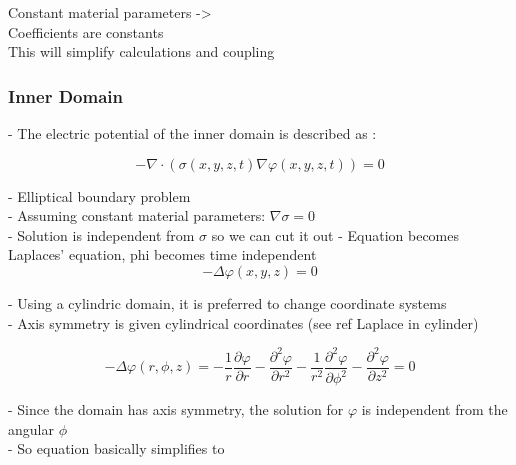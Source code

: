 \documentclass[parskip=half, titlepage=yes, 12pt, BCOR=12mm, DIV=calc]{scrartcl}
\begin{document}
Constant material parameters -> \\
Coefficients are constants \\
This will simplify calculations and coupling \\

\subsubsection{Inner Domain}

- The electric potential of the inner domain is described as : 

\begin{equation}
    - \nabla \cdot (\sigma(x,y,z,t) \nabla \varphi(x,y,z,t)) = 0
\end{equation}

- Elliptical boundary problem \\
- Assuming constant material parameters: $\nabla \sigma = 0$ \\
- Solution is independent from $\sigma$ so we can cut it out
- Equation becomes Laplaces' equation, phi becomes time independent \\

\begin{equation}
    - \Delta \varphi(x,y,z) = 0
\end{equation}

- Using a cylindric domain, it is preferred to change coordinate systems \\
- Axis symmetry is given cylindrical coordinates (see ref Laplace in cylinder)

\begin{equation}
    - \Delta \varphi(r,\phi,z) = - \frac{1}{r} \frac{\partial \varphi}{\partial r} - \frac{\partial^2 \varphi}{\partial r^2} - \frac{1}{r^2} \frac{\partial^2 \varphi}{\partial \phi^2} -      \frac{\partial^2 \varphi}{\partial z^2}  = 0
\end{equation}

- Since the domain has axis symmetry, the solution for $\varphi$ is independent from the angular $\phi$ \\
- So equation basically simplifies to 

\end{document}
